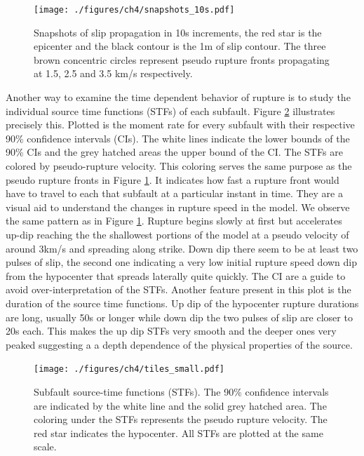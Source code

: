 \begin{figure}[!ht] 
  \centering
  \texttt{[image: ./figures/ch4/snapshots\_10s.pdf]}
    \caption[Model snapshots]{Snapshots of slip propagation in 10s increments, the red star is the epicenter and the black contour is the 1m of slip contour. The three brown concentric circles represent pseudo rupture fronts propagating at 1.5, 2.5 and 3.5 km/s respectively.}
  \label{fig_snapshots}
\end{figure}

Another way to examine the time dependent behavior of rupture is to study the individual source time functions (STFs) of each subfault. Figure \ref{fig_tiles} illustrates precisely this. Plotted is the moment rate for every subfault with their respective 90\% confidence intervals (CIs). The white lines indicate the lower bounds of the 90\% CIs and the grey hatched areas the upper bound of the CI. The STFs are colored by pseudo-rupture velocity. This coloring serves the same purpose as the pseudo rupture fronts in Figure \ref{fig_snapshots}. It indicates how fast a rupture front would have to travel to each that subfault at a particular instant in time. They are a visual aid to understand the changes in rupture speed in the model. We observe the same pattern as in Figure \ref{fig_snapshots}. Rupture begins slowly at first but accelerates up-dip reaching the the shallowest portions of the model at a pseudo velocity of around 3km/s and spreading along strike. Down dip there seem to be at least two pulses of slip, the second one indicating a very low initial rupture speed down dip from the hypocenter that spreads laterally quite quickly. The CI are a guide to avoid over-interpretation of the STFs. Another feature present in this plot is the duration of the source time functions. Up dip of the hypocenter rupture durations are long, usually 50s or longer while down dip the two pulses of slip are closer to 20s each. This makes the up dip STFs very smooth and the deeper ones very peaked suggesting a a depth dependence of the physical properties of the source.

\begin{figure}
    \texttt{[image: ./figures/ch4/tiles\_small.pdf]}
    \caption[Subfault source-time functions]{Subfault source-time functions (STFs). The 90\% confidence intervals are indicated by the white line and the solid grey hatched area. The coloring under the STFs represents the pseudo rupture velocity. The red star indicates the hypocenter. All STFs are plotted at the same scale.}
    \label{fig_tiles}
\end{figure}

